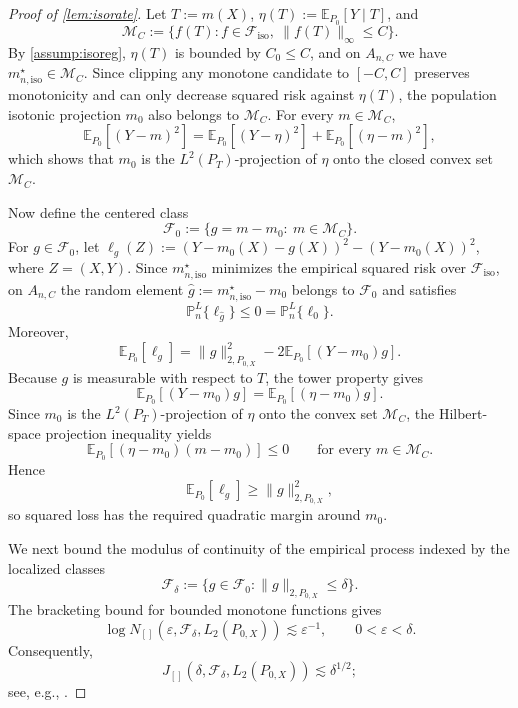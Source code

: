 \documentclass{article}
\theoremstyle{plain}
\theoremstyle{definition}
\newcommand{\E}{\mathbb{E}}
\newcommand{\1}{\mathbbm{1}}
\newcommand{\mhat}{m}
\newcommand{\Pl}{\mathbb{P}^{L}_n}
\newcommand{\Px}{P_{0,X}}
\begin{document}
\begin{proof}[Proof of \cref{lem:isorate}]

Let \(T:=\mhat(X)\), \(\eta(T):=\E_{P_0}[Y\mid T]\), and
\[
\mathcal M_C:=\{f(T):f\in\mathcal F_{\mathrm{iso}},\ \|f(T)\|_\infty\le C\}.
\]
By \cref{assump:isoreg}, \(\eta(T)\) is bounded by \(C_0\le C\), and on \(A_{n,C}\) we have \(m_{n,\mathrm{iso}}^\star\in\mathcal M_C\). Since clipping any monotone candidate to \([-C,C]\) preserves monotonicity and can only decrease squared risk against \(\eta(T)\), the population isotonic projection \(m_0\) also belongs to \(\mathcal M_C\). For every \(m\in\mathcal M_C\),
\[
\E_{P_0}[(Y-m)^2]
=
\E_{P_0}[(Y-\eta)^2]+\E_{P_0}[(\eta-m)^2],
\]
which shows that \(m_0\) is the \(L^2(P_T)\)-projection of \(\eta\) onto the closed convex set \(\mathcal M_C\).

Now define the centered class
\[
\mathcal F_0:=\{g=m-m_0:\ m\in\mathcal M_C\}.
\]
For \(g\in\mathcal F_0\), let \(\ell_g(Z):=(Y-m_0(X)-g(X))^2-(Y-m_0(X))^2\), where \(Z=(X,Y)\). Since \(m_{n,\mathrm{iso}}^\star\) minimizes the empirical squared risk over \(\mathcal F_{\mathrm{iso}}\), on \(A_{n,C}\) the random element \(\hat g:=m_{n,\mathrm{iso}}^\star-m_0\) belongs to \(\mathcal F_0\) and satisfies
\[
\Pl\{\ell_{\hat g}\}\le 0=\Pl\{\ell_0\}.
\]
Moreover,
\[
\E_{P_0}[\ell_g]
=
\|g\|_{2,\Px}^2-2\E_{P_0}[(Y-m_0)g].
\]
Because \(g\) is measurable with respect to \(T\), the tower property gives
\[
\E_{P_0}[(Y-m_0)g]
=
\E_{P_0}[(\eta-m_0)g].
\]
Since \(m_0\) is the \(L^2(P_T)\)-projection of \(\eta\) onto the convex set \(\mathcal M_C\), the Hilbert-space projection inequality yields
\[
\E_{P_0}[(\eta-m_0)(m-m_0)]\le 0
\qquad\text{for every }m\in\mathcal M_C.
\]
Hence
\[
\E_{P_0}[\ell_g] \ge \|g\|_{2,\Px}^2,
\]
so squared loss has the required quadratic margin around \(m_0\).

We next bound the modulus of continuity of the empirical process indexed by the localized classes
\[
\mathcal F_\delta:=\{g\in\mathcal F_0:\|g\|_{2,\Px}\le \delta\}.
\]
The bracketing bound for bounded monotone functions gives
\[
\log N_{[]}(\varepsilon,\mathcal F_\delta,L_2(\Px))
\lesssim
\varepsilon^{-1},
\qquad 0<\varepsilon<\delta.
\]
Consequently,
\[
J_{[]}(\delta,\mathcal F_\delta,L_2(\Px))\lesssim \delta^{1/2};
\]
see, e.g., \citet{vdvwellner1996}.


\end{proof}
\end{document}
